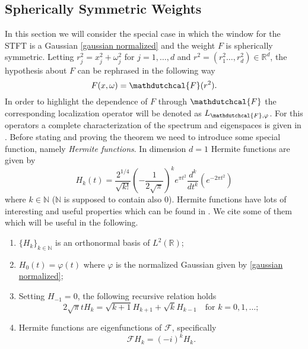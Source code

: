 \documentclass[corpo=11pt, stile=classica, tipotesi=custom,
greek, evenboxes, english]{toptesi}
\numberwithin{equation}{chapter}
\theoremstyle{remark}
\newcommand{\R}{\mathbb{R}} %
\newcommand{\N}{\mathbb{N}} %
\newcommand{\F}{\mathscr{F}} %
\begin{document}
\subsection{Spherically Symmetric Weights}\label{spherically symmetric weights section}
In this section we will consider the special case in which the window for the STFT is a Gaussian \eqref{gaussian normalized} and the weight $F$ is spherically symmetric. Letting $r_j^2 = x_j^2 + \omega_j^2$ for $j=1,\ldots,d$ and $r^2=(r_1^2\ldots,r_d^2) \in \R^d$, the hypothesis about $F$ can be rephrased in the following way
\begin{equation}\label{spherically symmetric weight}
	F(x,\omega) = \mathdutchcal{F}(r^2).
\end{equation}
{\color{blue} In order to highlight the dependence of $F$ through $\mathdutchcal{F}$ the corresponding localization operator will be denoted as $L_{\mathdutchcal{F},\varphi}$}.
For this operators a complete characterization of the spectrum and eigenspaces is given in \cite{daubechies}. Before stating and proving the theorem we need to introduce some special function, namely \emph{Hermite functions}. In dimension $d=1$ Hermite functions are given by
\begin{equation}\label{Hermite function 1-dimensional}
	H_k(t) = \dfrac{2^{1/4}}{\sqrt{k!}}\left(-\dfrac{1}{2\sqrt{\pi}}\right)^k e^{\pi t^2} \dfrac{d^k}{dt^k}\left(e^{-2\pi t^2}\right)
\end{equation}
where $k \in \N$ ($\N$ is supposed to contain also 0). Hermite functions have lots of interesting and useful properties which can be found in \cite[][Section 1.7]{folland_harmonic}. We cite some of them which will be useful in the following.
\begin{enumerate}[label=(\roman*)]
	\item $\{H_k\}_{k \in \N}$ is an orthonormal basis of $L^2(\R)$;
	\item $H_0(t) = \varphi(t)$ where $\varphi$ is the normalized Gaussian given by \eqref{gaussian normalized};
	\item Setting $H_{-1} = 0$, the following recursive relation holds
	\begin{equation}\label{Hermite functions recursion}
		2\sqrt{\pi}t H_k = \sqrt{k+1}H_{k+1} + \sqrt{k}H_{k-1} \quad \text{for } k=0,1,\ldots;
	\end{equation}
	\item Hermite functions are eigenfunctions of $\F$, specifically
	\begin{equation}\label{Hermite functions are eigenfunctions of Fourier transform}
		\F H_k =(-i)^k H_k.
	\end{equation}
\end{enumerate}
\end{document}
